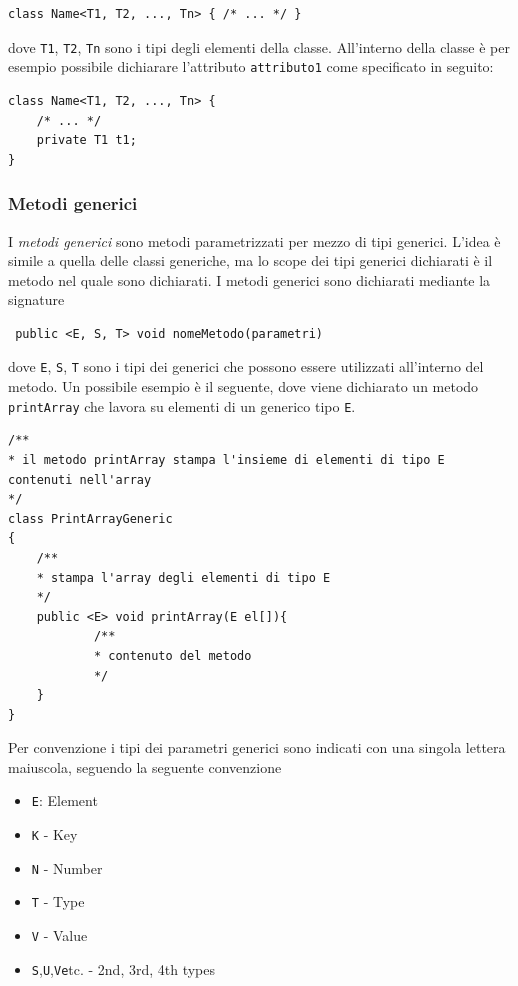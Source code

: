 \documentclass{article}
\begin{document}
\begin{lstlisting}
class Name<T1, T2, ..., Tn> { /* ... */ }
\end{lstlisting}

dove \texttt{T1}, \texttt{T2}, \texttt{Tn} sono i tipi degli elementi della classe. All'interno della classe \`e per esempio possibile dichiarare l'attributo \texttt{attributo1} come specificato in seguito:

\begin{lstlisting}
class Name<T1, T2, ..., Tn> { 
    /* ... */
    private T1 t1;
}
\end{lstlisting}

\subsubsection{Metodi generici}
I \emph{metodi generici} sono metodi parametrizzati per mezzo di tipi generici. L'idea \`e simile a quella delle classi generiche, ma lo scope dei tipi generici dichiarati \`e il metodo nel quale sono  dichiarati. I metodi generici sono dichiarati mediante la signature

\begin{lstlisting}
 public <E, S, T> void nomeMetodo(parametri)
\end{lstlisting}

dove \texttt{E}, \texttt{S}, \texttt{T} sono i tipi dei generici che possono essere utilizzati all'interno del metodo. Un possibile esempio \`e il seguente, dove viene dichiarato un metodo \texttt{printArray} che lavora su elementi di un generico tipo \texttt{E}.

\begin{lstlisting}
/**
* il metodo printArray stampa l'insieme di elementi di tipo E contenuti nell'array
*/
class PrintArrayGeneric
{
    /**
    * stampa l'array degli elementi di tipo E
    */
    public <E> void printArray(E el[]){
            /**
            * contenuto del metodo
            */
    }
}
\end{lstlisting}

Per convenzione i tipi dei parametri generici sono indicati con una singola lettera maiuscola, seguendo la seguente convenzione
\begin{itemize}
\item \texttt{E}: Element
\item \texttt{K} - Key
\item \texttt{N} - Number
\item \texttt{T} - Type
\item \texttt{V} - Value
\item \texttt{S},\texttt{U},\texttt{V}\texttt etc. - 2nd, 3rd, 4th types
\end{itemize}
\end{document}
